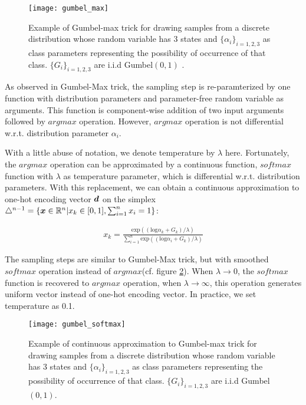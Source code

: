 \begin{figure}[h!]
	\begin{center} \label{gumbel_max}
		\texttt{[image: gumbel\_max]}
		\caption{Example of Gumbel-max trick for drawing samples from a discrete distribution whose random variable has 3 states and $\{\alpha_{i}\}_{i=1,2,3}$ as class parameters representing the possibility of occurrence of that class. $\{G_{i}\}_{i=1,2,3}$ are i.i.d Gumbel$(0,1)$ \cite{maddison2016concrete}.}		
		\label{fig:gumbel_max}
	\end{center}
\end{figure}

As observed in Gumbel-Max trick, the sampling step is re-paramterized by one function with distribution parameters and parameter-free random variable as arguments. This function is component-wise addition of two input arguments followed by $argmax$ operation. However, $argmax$ operation is not differential w.r.t. distribution parameter $\alpha_i$. 

With a little abuse of notation, we denote temperature by $\lambda$ here. Fortunately, the $argmax$ operation can be approximated by a continuous function, $softmax$ function with $\lambda$ as temperature parameter, which is differential w.r.t. distribution parameters. With this replacement, we can obtain a continuous approximation to one-hot encoding vector $\boldsymbol d$ on the simplex $\triangle^{n-1} = \{\boldsymbol x \in \mathbb R^n | x_k \in [0,1], \sum_{i=1}^{n} x_i = 1 \}$:

\begin{equation} \label{gumbel_softmax}
\begin{aligned}
x_{k} = \frac{\text{exp}((\text{log}\alpha_k + G_k)/\lambda)}{\sum_{i=1}^{n}\text{exp}((\text{log}\alpha_i + G_k)/\lambda)}
\end{aligned}
\end{equation}

The sampling steps are similar to Gumbel-Max trick, but with smoothed $softmax$ operation instead of $argmax$(cf. figure \ref{fig:gumbel_softmax}). When $\lambda \rightarrow 0$, the $softmax$ function is recovered to $argmax$ operation, when $\lambda \rightarrow \infty$, this operation generates uniform vector instead of one-hot encoding vector. In practice, we set temperature as 0.1.

\begin{figure}[h!]
	\begin{center}
		\texttt{[image: gumbel\_softmax]}
		\caption{Example of continuous approximation to Gumbel-max trick for drawing samples from a discrete distribution whose random variable has 3 states and $\{\alpha_{i}\}_{i=1,2,3}$ as class parameters representing the possibility of occurrence of that class. $\{G_{i}\}_{i=1,2,3}$ are i.i.d Gumbel$(0,1)$\cite{maddison2016concrete}.}		
		\label{fig:gumbel_softmax}
	\end{center}
\end{figure}

